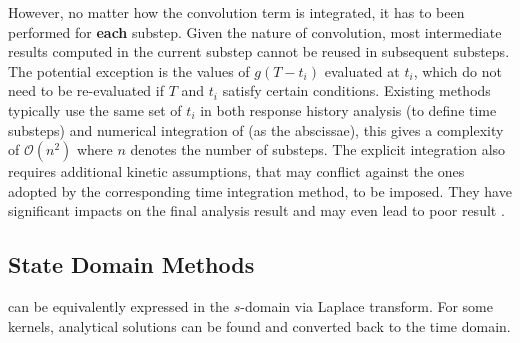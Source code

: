However, no matter how the convolution term is integrated, it has to been performed for \textbf{each} substep. Given the nature of convolution, most intermediate results computed in the current substep cannot be reused in subsequent substeps. The potential exception is the values of $g(T-t_i)$ evaluated at $t_i$, which do not need to be re-evaluated if $T$ and $t_i$ satisfy certain conditions. Existing methods typically use the same set of $t_i$ in both response history analysis (to define time substeps) and numerical integration of  (as the abscissae), this gives a complexity of $\mathcal{O}\left(n^2\right)$ where $n$ denotes the number of substeps. The explicit integration also requires additional kinetic assumptions, that may conflict against the ones adopted by the corresponding time integration method, to be imposed. They have significant impacts on the final analysis result \citep[see][]{Liu2014} and may even lead to poor result \cite[see][Figs. 12, 17, 25, 26]{Liu2023}.
\subsection{State Domain Methods}
 can be equivalently expressed in the $s$-domain via Laplace transform. For some kernels, analytical solutions can be found and converted back to the time domain.